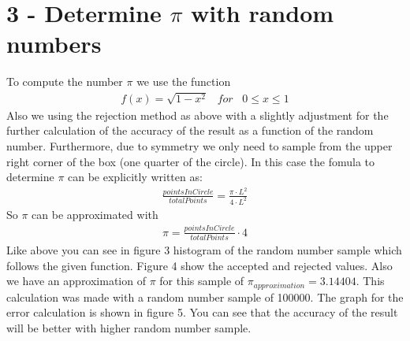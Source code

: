 \documentclass[11pt, a4paper, reqno]{scrartcl}
\begin{document}
 	\newpage
 	
	\section*{3 - Determine $\pi$ with random numbers}
		
		To compute the number $\pi$ we use the function
		\begin{align}
			f(x) = \sqrt{1 - x^2} \;\;\; for \;\;\; 0 \leq x \leq 1
		\end{align}
		Also we using the rejection method as above with a slightly adjustment for 			the further calculation of the accuracy of the result as a function of the 			random number. Furthermore, due to symmetry we only need to sample from the 		upper right corner of the box (one quarter of the circle). In this case the 		fomula to determine $\pi$ can be explicitly written as:
		\begin{align*}
			\frac{pointsInCircle}{totalPoints} = \frac{\pi \cdot L^2}{4 \cdot L^2}
		\end{align*}
        So $\pi$ can be approximated with
        \begin{align*}
        	\pi = \frac{pointsInCircle}{totalPoints} \cdot 4
        \end{align*}
        \newline
        Like above you can see in figure 3 histogram of the random number sample 			which follows the given function. Figure 4 show the accepted and rejected 			values. Also we have an approximation of $\pi$ for this sample of 					$\pi_{approximation} = 3.14404$. This calculation was made with a random 			number sample of 100000.
        \newline
        The graph for the error calculation is shown in figure 5. You can see that 			the accuracy of the result will be better with higher random number sample.
        
        \begin{figure}[H]
     		
     	\end{figure}
     	
\end{document}
